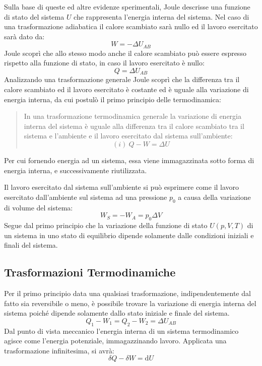 \documentclass{article}
\newcommand{\df}{\mathrm{d}}
\numberwithin{equation}{subsection}
\begin{document}
Sulla base di queste ed altre evidenze sperimentali, Joule 
descrisse una funzione di stato del sistema $U$ che 
rappresenta l'energia interna del sistema. Nel caso di una 
trasformazione adiabatica il calore scambiato sarà nullo ed il 
lavoro esercitato sarà dato da:
\begin{equation}
    W=-\Delta U_{AB}
\end{equation}
Joule scoprì che allo stesso modo anche il calore scambiato 
può essere espresso 
rispetto alla funzione di stato, in caso il lavoro esercitato 
è nullo:
\begin{equation}
    Q=\Delta U_{AB}
\end{equation}
Analizzando una trasformazione generale Joule scoprì che 
la differenza tra il calore scambiato ed il lavoro esercitato è 
costante ed è uguale alla variazione di energia interna, da cui 
postulò il primo principio delle termodinamica:
\begin{quotation}
    In una trasformazione termodinamica generale la variazione 
    di energia interna del sistema è uguale alla differenza tra 
    il calore scambiato tra il sistema e l'ambiente e il lavoro 
    esercitato dal sistema sull'ambiente:
    \begin{equation*}
     (i)\:   Q-W=\Delta U
    \end{equation*}
\end{quotation}
Per cui fornendo energia ad un sistema, essa viene immagazzinata sotto forma di energia interna, e successivamente riutilizzata. 



Il lavoro esercitato dal sistema sull'ambiente si può 
esprimere come il lavoro esercitato dall'ambiente sul sistema 
ad una pressione $p_0$ a causa della variazione di volume 
del sistema:
\begin{equation*}
    W_S=-W_A=p_0\Delta V
\end{equation*}
Segue dal primo principio che la 
variazione della funzione di stato $U(p,V,T)$ di un sistema in uno stato 
di equilibrio dipende solamente dalle condizioni iniziali e 
finali del sistema. 

\subsection{Trasformazioni Termodinamiche}
Per il primo principio data una qualsiasi trasformazione, 
indipendentemente dal fatto sia reversibile o meno, è 
possibile trovare la variazione di energia interna del 
sistema
poiché dipende solamente dallo stato iniziale e finale del sistema. 
\begin{equation*}
    Q_1-W_1=Q_2-W_2=\Delta U_{AB}
\end{equation*}
Dal punto di vista meccanico l'energia interna di un 
sistema termodinamico agisce 
come l'energia potenziale, immagazzinando lavoro. 
Applicata una trasformazione infinitesima, si avrà:
\begin{equation*}
    \delta Q-\delta W=\df U
\end{equation*}
\end{document}
